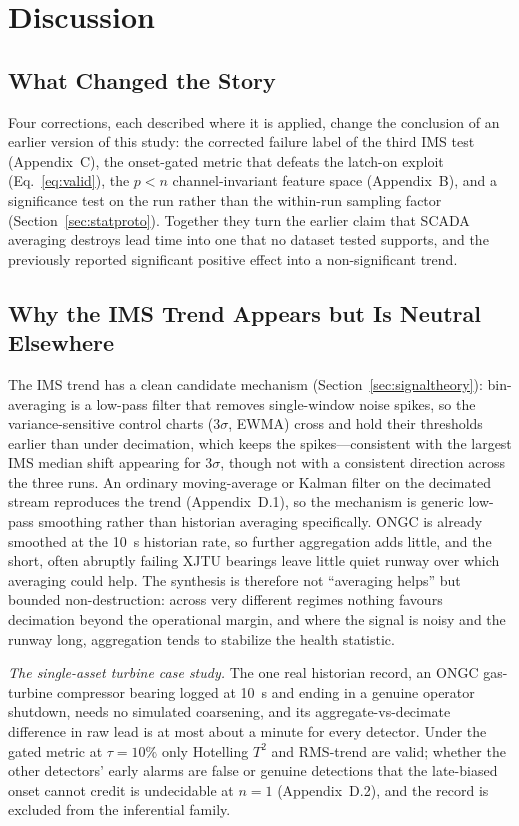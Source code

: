 \documentclass[IJPHM, 2026, 0]{PHMSociety}
\begin{document}
\FloatBarrier
\section{Discussion}
\label{sec:discussion}

\subsection{What Changed the Story}
Four corrections, each described where it is applied, change the conclusion of an earlier version of this study: the corrected failure label of the third IMS test (Appendix~C), the onset-gated metric that defeats the latch-on exploit (Eq.~\ref{eq:valid}), the $p < n$ channel-invariant feature space (Appendix~B), and a significance test on the run rather than the within-run sampling factor (Section~\ref{sec:statproto}). Together they turn the earlier claim that SCADA averaging destroys lead time into one that no dataset tested supports, and the previously reported significant positive effect into a non-significant trend.

\subsection{Why the IMS Trend Appears but Is Neutral Elsewhere}
The IMS trend has a clean candidate mechanism (Section~\ref{sec:signaltheory}): bin-averaging is a low-pass filter that removes single-window noise spikes, so the variance-sensitive control charts ($3\sigma$, EWMA) cross and hold their thresholds earlier than under decimation, which keeps the spikes---consistent with the largest IMS median shift appearing for $3\sigma$, though not with a consistent direction across the three runs. An ordinary moving-average or Kalman filter on the decimated stream reproduces the trend (Appendix~D.1), so the mechanism is generic low-pass smoothing rather than historian averaging specifically. ONGC is already smoothed at the 10~s historian rate, so further aggregation adds little, and the short, often abruptly failing XJTU bearings leave little quiet runway over which averaging could help. The synthesis is therefore not ``averaging helps'' but bounded non-destruction: across very different regimes nothing favours decimation beyond the operational margin, and where the signal is noisy and the runway long, aggregation tends to stabilize the health statistic.

\emph{The single-asset turbine case study.} The one real historian record, an ONGC gas-turbine compressor bearing logged at 10~s and ending in a genuine operator shutdown, needs no simulated coarsening, and its aggregate-vs-decimate difference in raw lead is at most about a minute for every detector. Under the gated metric at $\tau=10\%$ only Hotelling $T^2$ and RMS-trend are valid; whether the other detectors' early alarms are false or genuine detections that the late-biased onset cannot credit is undecidable at $n=1$ (Appendix~D.2), and the record is excluded from the inferential family.
\end{document}
